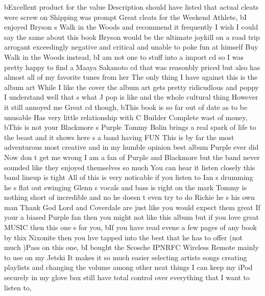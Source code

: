 \documentclass[
]{article}
\newenvironment{Shaded}{}{}
\newcommand{\NormalTok}[1]{#1}
\newcommand{\StringTok}[1]{\textcolor[rgb]{0.25,0.44,0.63}{#1}}
\begin{document}
\begin{Shaded}
\begin{Highlighting}[]
\NormalTok{       b}\StringTok{\textquotesingle{}Excellent product for the value Description should have listed that actual cleats were screw on Shipping was prompt Great cleats for the Weekend Athlete\textquotesingle{}}\NormalTok{,}
\NormalTok{       b}\StringTok{\textquotesingle{}I enjoyed Bryson s Walk in the Woods and recommend it frequently I wish I could say the same about this book Bryson would be the ultimate joykill on a road trip arrogant exceedingly negative and critical and unable to poke fun at himself Buy Walk in the Woods instead\textquotesingle{}}\NormalTok{,}
\NormalTok{       b}\StringTok{\textquotesingle{}I am not one to stuff into a import cd so I was pretty happy to find a Maaya Sakanoto cd that was reasonbly priced but also has almost all of my favorite tunes from her The only thing I have against this is the album art While I like the cover the album art gets pretty ridicudlous and poppy I understand well that s what J pop is like and the whole cultural thing However it still annoyed me Great cd though\textquotesingle{}}\NormalTok{,}
\NormalTok{       b}\StringTok{\textquotesingle{}This book is so far out of date as to be unusable Has very little relationship with C Builder Complete wast of money\textquotesingle{}}\NormalTok{,}
\NormalTok{       b}\StringTok{\textquotesingle{}This is not your Blackmore s Purple Tommy Bolin brings a real spark of life to the beast and it shows here s a band having FUN This is by far the most adventurous most creative and in my humble opinion best album Purple ever did Now don t get me wrong I am a fan of Purple and Blackmore but the band never sounded like they enjoyed themselves so much You can hear it listen closely this band lineup is tight All of this is very noticable if you listen to Ian s drumming he s flat out swinging Glenn s vocals and bass is right on the mark Tommy is nothing short of incredible and no he doesn t even try to do Richie he s his own man Thank God Lord and Coverdale are just like you would expect them great If your a biased Purple fan then you might not like this album but if you love great MUSIC then this one s for you\textquotesingle{}}\NormalTok{,}
\NormalTok{       b}\StringTok{\textquotesingle{}If you have read evene a few pages of any book by thix Nixonite then you hve tapped into the best that he has to offer (not much )Pass on this one\textquotesingle{}}\NormalTok{,}
\NormalTok{       b}\StringTok{\textquotesingle{}I bought the Scosche IPNRFC Wireless Remote mainly to use on my Jetski It makes it so much easier selecting artists songs creating playlists and changing the volume among other neat things I can keep my iPod securely in my glove box still have total control over everything that I want to listen to\textquotesingle{}}\NormalTok{,}

\end{Highlighting}
\end{Shaded}
\end{document}
